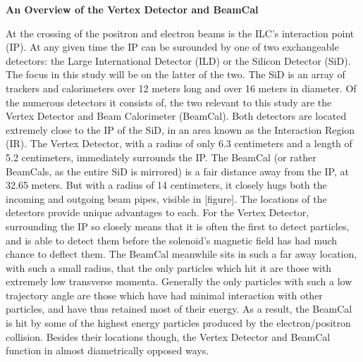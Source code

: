 \documentclass{article}
\begin{document}
        \vspace{5mm}
        \begin{center} \bf{An Overview of the Vertex Detector and BeamCal} \end{center}

        At the crossing of the positron and electron beams is the ILC's interaction point (IP). At any given time the IP can be surounded by one of two exchangeable detectors: the Large International Detector (ILD) or the Silicon Detector (SiD). The focus in this study will be on the latter of the two. The SiD is an array of trackers and calorimeters over 12 meters long and over 16 meters in diameter. Of the numerous detectors it consists of, the two relevant to this study are the Vertex Detector and Beam Calorimeter (BeamCal). Both detectors are located extremely close to the IP of the SiD, in an area known as the Interaction Region (IR). The Vertex Detector, with a radius of only 6.3 centimeters and a length of 5.2 centimeters, immediately surrounds the IP. The BeamCal (or rather BeamCals, as the entire SiD is mirrored) is a fair distance away from the IP, at 32.65 meters. But with a radius of 14 centimeters, it closely hugs both the incoming and outgoing beam pipes, visible in [figure]. The locations of the detectors provide unique advantages to each. For the Vertex Detector, surrounding the IP so closely means that it is often the first to detect particles, and is able to detect them before the solenoid's magnetic field has had much chance to deflect them. The BeamCal meanwhile sits in such a far away location, with such a small radius, that the only particles which hit it are those with extremely low transverse momenta. Generally the only particles with such a low trajectory angle are those which have had minimal interaction with other particles, and have thus retained most of their energy. As a result, the BeamCal is hit by some of the highest energy particles produced by the electron/positron collision. Besides their locations though, the Vertex Detector and BeamCal function in almost diametrically opposed ways.
\end{document}

